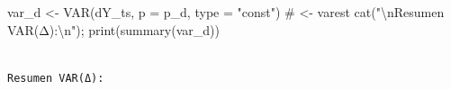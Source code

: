 \documentclass[
  spanish,
  letterpaper,
  DIV=11,
  numbers=noendperiod]{scrartcl}
\newenvironment{Shaded}{\begin{snugshade}}{\end{snugshade}}
\newcommand{\AttributeTok}[1]{\textcolor[rgb]{0.40,0.45,0.13}{#1}}
\newcommand{\CommentTok}[1]{\textcolor[rgb]{0.37,0.37,0.37}{#1}}
\newcommand{\FunctionTok}[1]{\textcolor[rgb]{0.28,0.35,0.67}{#1}}
\newcommand{\NormalTok}[1]{\textcolor[rgb]{0.00,0.23,0.31}{#1}}
\newcommand{\OtherTok}[1]{\textcolor[rgb]{0.00,0.23,0.31}{#1}}
\newcommand{\SpecialCharTok}[1]{\textcolor[rgb]{0.37,0.37,0.37}{#1}}
\newcommand{\StringTok}[1]{\textcolor[rgb]{0.13,0.47,0.30}{#1}}
\begin{document}
\begin{Shaded}
\begin{Highlighting}[]
\NormalTok{var\_d }\OtherTok{\textless{}{-}} \FunctionTok{VAR}\NormalTok{(dY\_ts, }\AttributeTok{p =}\NormalTok{ p\_d, }\AttributeTok{type =} \StringTok{"const"}\NormalTok{)   }\CommentTok{\# \textless{}{-} \textquotesingle{}varest\textquotesingle{}}
\FunctionTok{cat}\NormalTok{(}\StringTok{"}\SpecialCharTok{\textbackslash{}n}\StringTok{Resumen VAR(Δ):}\SpecialCharTok{\textbackslash{}n}\StringTok{"}\NormalTok{); }\FunctionTok{print}\NormalTok{(}\FunctionTok{summary}\NormalTok{(var\_d))}
\end{Highlighting}
\end{Shaded}

\begin{verbatim}

Resumen VAR(Δ):
\end{verbatim}
\end{document}
